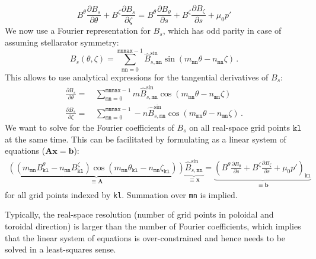 \begin{equation}
   B^\theta \frac{\partial B_s}{\partial \theta}
 + B^\zeta \frac{\partial B_s}{\partial \zeta}
 =   B^\theta  \frac{\partial B_\theta}{\partial s}
   + B^\zeta   \frac{\partial B_\zeta }{\partial s}
   + \mu_0 p' \label{eqn:radial_force_balance}
\end{equation}
We now use a Fourier representation for $B_s$,
which has odd parity in case of assuming stellarator symmetry:
\begin{equation}
 B_s(\theta, \zeta) =
 \sum\limits_{\texttt{mn}=0}^{\texttt{mnmax}-1}
   \hat{B}^\textrm{sin}_{s,\texttt{mn}}
   \sin(m_\texttt{mn} \theta - n_\texttt{mn} \zeta) \, .
\end{equation}
This allows to use analytical expressions
for the tangential derivatives of $B_s$:
\begin{align}
 \frac{\partial B_s}{\partial \theta} =&\,
 \sum\limits_{\texttt{mn}=0}^{\texttt{mnmax}-1}
   m \hat{B}^\textrm{sin}_{s,\texttt{mn}}
   \cos(m_\texttt{mn} \theta - n_\texttt{mn} \zeta) \\
 \frac{\partial B_s}{\partial \zeta} =&\,
 \sum\limits_{\texttt{mn}=0}^{\texttt{mnmax}-1}
   -n \hat{B}^\textrm{sin}_{s,\texttt{mn}}
   \cos(m_\texttt{mn} \theta - n_\texttt{mn} \zeta) \, .
\end{align}
We want to solve  for the Fourier coefficients of $B_s$
on all real-space grid points $\texttt{kl}$ at the same time.
This can be facilitated by formulating 
as a linear system of equations ($\mathbf{A} \mathbf{x} = \mathbf{b}$):
\begin{align}
  \underbrace{
  \left(
    (  m_\texttt{mn} B^\theta_\texttt{kl}
     - n_\texttt{mn} B^\zeta_\texttt{kl} )
     \cos(  m_\texttt{mn} \theta_\texttt{kl}
          - n_\texttt{mn} \zeta_\texttt{kl})
  \right)
  }_{\equiv \mathbf{A}}
  \underbrace{
    \hat{B}^\textrm{sin}_{s,\texttt{mn}}
  }_{\equiv \mathbf{x}}
  =
  \underbrace{
    \left(
       B^\theta  \frac{\partial B_\theta}{\partial s}
     + B^\zeta   \frac{\partial B_\zeta }{\partial s}
     + \mu_0 p'
    \right)_\texttt{kl}
  }_{\equiv \mathbf{b}}
\end{align}
for all grid points indexed by \texttt{kl}.
Summation over \texttt{mn} is implied.

Typically, the real-space resolution
(number of grid points in poloidal and toroidal direction)
is larger than the number of Fourier coefficients,
which implies that the linear system of equations
is over-constrained and hence needs to be
solved in a least-squares sense.

